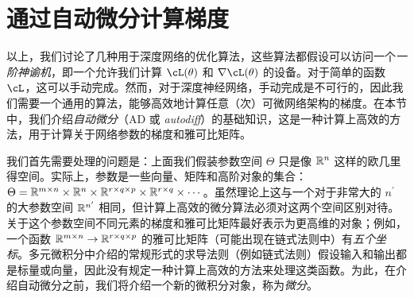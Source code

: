 \documentclass[../../book-main_zh.tex]{subfiles}
\begin{document}



\section{通过自动微分计算梯度}\label{sec:autodiff}

以上，我们讨论了几种用于深度网络的优化算法，这些算法都假设可以访问一个\textit{一阶神谕机}，即一个允许我们计算 \(\cL(\theta)\) 和 \(\nabla \cL(\theta)\) 的设备。对于简单的函数 \(\cL\)，这可以手动完成。然而，对于深度神经网络，手动完成是不可行的，因此我们需要一个通用的算法，能够高效地计算任意（次）可微网络架构的梯度。在本节中，我们介绍\textit{自动微分}（AD 或 \textit{autodiff}）的基础知识，这是一种计算上高效的方法，用于计算关于网络参数的梯度和雅可比矩阵。

我们首先需要处理的问题是：上面我们假装参数空间 \(\Theta\) 只是像 \(\mathbb{R}^{n}\) 这样的欧几里得空间。实际上，参数是一些向量、矩阵和高阶对象的集合：\(\Theta = \mathbb{R}^{m \times n} \times \mathbb{R}^{n} \times \mathbb{R}^{r \times q \times p} \times \mathbb{R}^{r \times q} \times \cdots\)。虽然理论上这与一个对于非常大的 \(n^{\prime}\) 的大参数空间 \(\mathbb{R}^{n^{\prime}}\) 相同，但计算上高效的微分算法必须对这两个空间区别对待。关于这个参数空间不同元素的梯度和雅可比矩阵最好表示为更高维的对象；例如，一个函数 \(\mathbb{R}^{m \times n} \to \mathbb{R}^{r \times q \times p}\) 的雅可比矩阵（可能出现在链式法则中）有\textit{五个坐标}。多元微积分中介绍的常规形式的求导法则（例如链式法则）假设输入和输出都是标量或向量，因此没有规定一种计算上高效的方法来处理这类函数。为此，在介绍自动微分之前，我们将介绍一个新的微积分对象，称为\textit{微分}。
\end{document}
